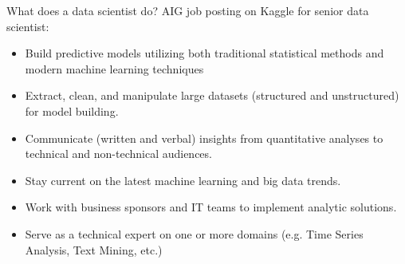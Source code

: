 \documentclass{beamer}\usepackage[]{graphicx}\usepackage[]{color}
\theoremstyle{mystyle}
\begin{document}
\begin{frame}%

\begin{center}
    {{\resizebox*{1.1\textwidth}{1.1\textheight}
        {}} \par}
  \end{center}
\end{frame}

\begin{frame}{What does a data scientist do?}
AIG job posting on Kaggle for senior data scientist:
\begin{itemize}
\item Build predictive models utilizing both traditional statistical methods and modern machine learning techniques 
\item Extract, clean, and manipulate large datasets (structured and unstructured) for model building.
\item Communicate (written and verbal) insights from quantitative analyses to technical and non-technical audiences. 
\item Stay current on the latest machine learning and big data trends.
\item Work with business sponsors and IT teams to implement analytic solutions.
\item Serve as a technical expert on one or more domains (e.g. Time Series Analysis, Text Mining, etc.) 
\end{itemize}
\end{frame}
\end{document}
